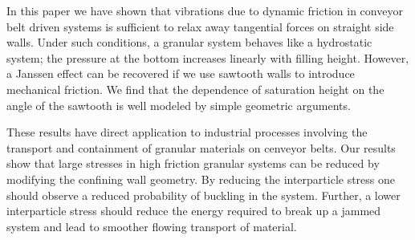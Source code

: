 
%
%
%


In this paper we have shown that vibrations due to dynamic friction in conveyor belt driven systems is sufficient to relax away tangential forces on straight side walls. Under such conditions, a granular system behaves like a hydrostatic system; the pressure at the bottom increases linearly with filling height.  However, a Janssen effect can be recovered if we use sawtooth walls to introduce mechanical friction.  We find that the dependence of saturation height on the angle of the sawtooth is well modeled by simple geometric arguments. 

These results have direct application to industrial processes involving the transport and containment of granular materials on cenveyor belts. Our results show that large stresses in high friction granular systems can be reduced by modifying the confining wall geometry. By reducing the interparticle stress one should observe a reduced probability of buckling in the system.  Further, a lower interparticle stress should reduce the energy required to break up a jammed system and lead to smoother flowing transport of material.  

